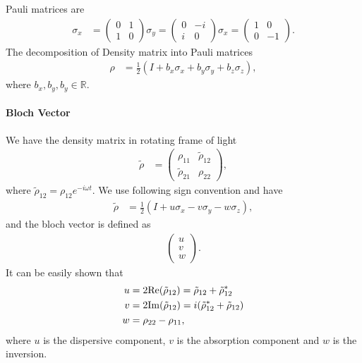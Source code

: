 \documentclass[../../note.tex]{subfiles}
\begin{document}
Pauli matrices are
\begin{align}
    \sigma_x
    &= \left(\begin{matrix}
        0 & 1\\
        1 & 0
    \end{matrix}\right)
    \sigma_y
    = \left(\begin{matrix}
        0 & -i\\
        i & 0
    \end{matrix}\right)
    \sigma_x
    = \left(\begin{matrix}
        1 & 0\\
        0 & -1
    \end{matrix}\right).
\end{align}
The decomposition of Density matrix into Pauli matrices
\begin{align}
    \rho
    &= \frac{1}{2}\left(I + b_x \sigma_x + b_y \sigma_y + b_z \sigma_z \right),
\end{align}
where $b_x, b_y,b_y \in \mathbb{R}$.

\paragraph{Bloch Vector}
We have the density matrix in rotating frame of light
\begin{align}
    \tilde{\rho}
    &= \left(\begin{matrix}
        \rho_{11} & \tilde{\rho}_{12} \\
        \tilde{\rho}_{21} & \rho_{22}
    \end{matrix}\right),
\end{align}
where $\tilde{\rho}_{12} = \rho_{12} e^{-i \omega t}$. We use following sign convention and have
\begin{align}
    \tilde{\rho}
    &= \frac{1}{2} \left(I + u \sigma_x - v \sigma_y - w \sigma_z \right),
\end{align}
and the bloch vector is defined as
\begin{align}
    \left(\begin{matrix}
        u \\
        v \\
        w
    \end{matrix}\right).
\end{align}
It can be easily shown that
\begin{align}
    u
    &= 2 {\rm Re}(\tilde{\rho}_{12}) = \tilde{\rho}_{12} + \tilde{\rho}_{12}^\ast \\
    v
    &= 2 {\rm Im}(\tilde{\rho}_{12}) = i (\tilde{\rho}_{12}^\ast + \tilde{\rho}_{12}) \\
    w
    &= \rho_{22} - \rho_{11}, \\
\end{align}
where $u$ is the dispersive component, $v$ is the absorption component and $w$ is the inversion.
\end{document}
